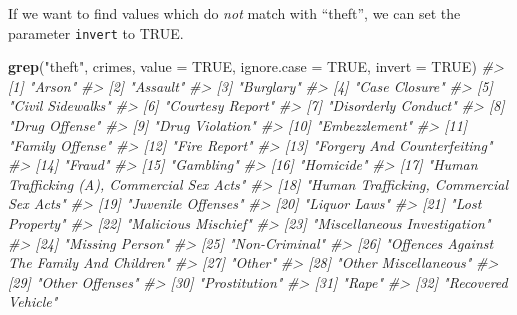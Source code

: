 \documentclass[
  12pt,
]{book}
\newenvironment{Shaded}{\begin{snugshade}}{\end{snugshade}}
\newcommand{\CommentTok}[1]{\textcolor[rgb]{0.56,0.35,0.01}{\textit{#1}}}
\newcommand{\DataTypeTok}[1]{\textcolor[rgb]{0.13,0.29,0.53}{#1}}
\newcommand{\KeywordTok}[1]{\textcolor[rgb]{0.13,0.29,0.53}{\textbf{#1}}}
\newcommand{\NormalTok}[1]{#1}
\newcommand{\OtherTok}[1]{\textcolor[rgb]{0.56,0.35,0.01}{#1}}
\newcommand{\StringTok}[1]{\textcolor[rgb]{0.31,0.60,0.02}{#1}}
\begin{document}
If we want to find values which do \emph{not} match with ``theft'', we can set the parameter \texttt{invert} to TRUE.

\begin{Shaded}
\begin{Highlighting}[]
\KeywordTok{grep}\NormalTok{(}\StringTok{"theft"}\NormalTok{, crimes, }\DataTypeTok{value =} \OtherTok{TRUE}\NormalTok{, }\DataTypeTok{ignore.case =} \OtherTok{TRUE}\NormalTok{, }\DataTypeTok{invert =} \OtherTok{TRUE}\NormalTok{)}
\CommentTok{\#>  [1] "Arson"                                     }
\CommentTok{\#>  [2] "Assault"                                   }
\CommentTok{\#>  [3] "Burglary"                                  }
\CommentTok{\#>  [4] "Case Closure"                              }
\CommentTok{\#>  [5] "Civil Sidewalks"                           }
\CommentTok{\#>  [6] "Courtesy Report"                           }
\CommentTok{\#>  [7] "Disorderly Conduct"                        }
\CommentTok{\#>  [8] "Drug Offense"                              }
\CommentTok{\#>  [9] "Drug Violation"                            }
\CommentTok{\#> [10] "Embezzlement"                              }
\CommentTok{\#> [11] "Family Offense"                            }
\CommentTok{\#> [12] "Fire Report"                               }
\CommentTok{\#> [13] "Forgery And Counterfeiting"                }
\CommentTok{\#> [14] "Fraud"                                     }
\CommentTok{\#> [15] "Gambling"                                  }
\CommentTok{\#> [16] "Homicide"                                  }
\CommentTok{\#> [17] "Human Trafficking (A), Commercial Sex Acts"}
\CommentTok{\#> [18] "Human Trafficking, Commercial Sex Acts"    }
\CommentTok{\#> [19] "Juvenile Offenses"                         }
\CommentTok{\#> [20] "Liquor Laws"                               }
\CommentTok{\#> [21] "Lost Property"                             }
\CommentTok{\#> [22] "Malicious Mischief"                        }
\CommentTok{\#> [23] "Miscellaneous Investigation"               }
\CommentTok{\#> [24] "Missing Person"                            }
\CommentTok{\#> [25] "Non{-}Criminal"                              }
\CommentTok{\#> [26] "Offences Against The Family And Children"  }
\CommentTok{\#> [27] "Other"                                     }
\CommentTok{\#> [28] "Other Miscellaneous"                       }
\CommentTok{\#> [29] "Other Offenses"                            }
\CommentTok{\#> [30] "Prostitution"                              }
\CommentTok{\#> [31] "Rape"                                      }
\CommentTok{\#> [32] "Recovered Vehicle"                         }

\end{Highlighting}
\end{Shaded}
\end{document}

